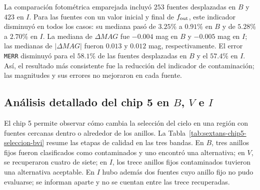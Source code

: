 \documentclass[12pt,letterpaper,oneside]{book}
\begin{document}
\begin{table}[H]
\centering
{}
\caption{Resumen de selección en los ocho chips de Sextans A para $B$ e $I$. $N_{\rm PHOT}$ cuenta mediciones con magnitud y error válidos; ``sin sol.'' son anillos fijos contaminados que no encontraron alternativa aceptable; ``sin eval.'' son fuentes aisladas cuyo anillo fijo no pudo medirse.}
\label{tab:sextans-bi-resumen}
\end{table}

La comparación fotométrica emparejada incluyó $253$ fuentes desplazadas en $B$ y $423$ en $I$. Para las fuentes con un valor inicial y final de $f_{\rm out}$, este indicador disminuyó en todos los casos: su mediana pasó de $3.25\%$ a $0.91\%$ en $B$ y de $5.28\%$ a $2.70\%$ en $I$. La mediana de $\Delta MAG$ fue $-0.004$ mag en $B$ y $-0.005$ mag en $I$; las medianas de $|\Delta MAG|$ fueron $0.013$ y $0.012$ mag, respectivamente. El error \texttt{MERR} disminuyó para el $58.1\%$ de las fuentes desplazadas en $B$ y el $57.4\%$ en $I$. Así, el resultado más consistente fue la reducción del indicador de contaminación; las magnitudes y sus errores no mejoraron en cada fuente.

\subsection{Análisis detallado del chip 5 en $B$, $V$ e $I$}
\label{subsec:resultados-chip5-bvi}

El chip 5 permite observar cómo cambia la selección del cielo en una región con fuentes cercanas dentro o alrededor de los anillos. La Tabla~\ref{tab:sextans-chip5-seleccion-bvi} resume las etapas de calidad en las tres bandas. En $B$, tres anillos fijos fueron clasificados como contaminados y uno encontró una alternativa; en $V$, se recuperaron cuatro de siete; en $I$, los trece anillos fijos contaminados tuvieron una alternativa aceptable. En $I$ hubo además dos fuentes cuyo anillo fijo no pudo evaluarse; se informan aparte y no se cuentan entre las trece recuperadas.
\end{document}
